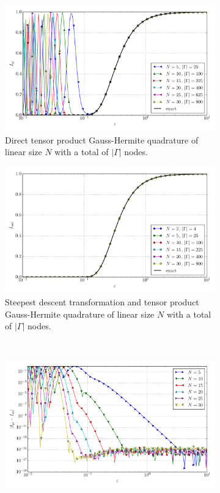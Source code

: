 \documentclass[a4paper,10pt]{article}
\begin{document}
\begin{figure}[ht!]
  \begin{subfigure}[t]{0.5\linewidth}
    \includegraphics[width=\linewidth]{./plots/tp_2d_conv_eps_(0,0)_(0,0)_val_qr.pdf}
    \caption{Direct tensor product Gauss-Hermite quadrature of linear size $N$ with a total of $|\Gamma|$ nodes.}
    \label{fig:tp_2d_conv_eps_00_00_val_qr}
  \end{subfigure}
  \begin{subfigure}[t]{0.5\linewidth}
    \includegraphics[width=\linewidth]{./plots/tp_2d_conv_eps_(0,0)_(0,0)_val_nsd.pdf}
    \caption{Steepest descent transformation and tensor product Gauss-Hermite quadrature of linear size $N$ with a total of $|\Gamma|$ nodes.}
    \label{fig:tp_2d_conv_eps_00_00_val_nsd}
  \end{subfigure} \\
  \begin{subfigure}[t]{0.5\linewidth}
    \includegraphics[width=\linewidth]{./plots/tp_2d_conv_eps_(0,0)_(0,0)_err_qr.pdf}

\end{subfigure}
\end{figure}
\end{document}
